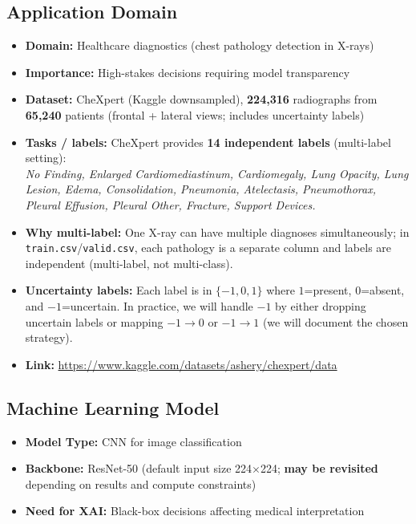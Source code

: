 \documentclass[12pt]{article}
\begin{document}
\subsection{Application Domain}
\begin{itemize}
    \item \textbf{Domain:} Healthcare diagnostics (chest pathology detection in X-rays)
    \item \textbf{Importance:} High-stakes decisions requiring model transparency
    \item \textbf{Dataset:} CheXpert (Kaggle downsampled), \textbf{224,316} radiographs from \textbf{65,240} patients (frontal + lateral views; includes uncertainty labels)
    \item \textbf{Tasks / labels:} CheXpert provides \textbf{14 independent labels} (multi-label setting): \\
    \textit{No Finding, Enlarged Cardiomediastinum, Cardiomegaly, Lung Opacity, Lung Lesion, Edema, Consolidation, Pneumonia, Atelectasis, Pneumothorax, Pleural Effusion, Pleural Other, Fracture, Support Devices.}
    \item \textbf{Why multi-label:} One X-ray can have multiple diagnoses simultaneously; in \texttt{train.csv}/\texttt{valid.csv}, each pathology is a separate column and labels are independent (multi-label, not multi-class).
    \item \textbf{Uncertainty labels:} Each label is in $\{-1,0,1\}$ where $1$=present, $0$=absent, and $-1$=uncertain. In practice, we will handle $-1$ by either dropping uncertain labels or mapping $-1 \rightarrow 0$ or $-1 \rightarrow 1$ (we will document the chosen strategy).
    \item \textbf{Link:} \url{https://www.kaggle.com/datasets/ashery/chexpert/data}
\end{itemize}

\subsection{Machine Learning Model}
\begin{itemize}
    \item \textbf{Model Type:} CNN for image classification
    \item \textbf{Backbone:} ResNet-50 (default input size 224$\times$224; \textbf{may be revisited} depending on results and compute constraints)
    \item \textbf{Need for XAI:} Black-box decisions affecting medical interpretation
\end{itemize}
\end{document}
